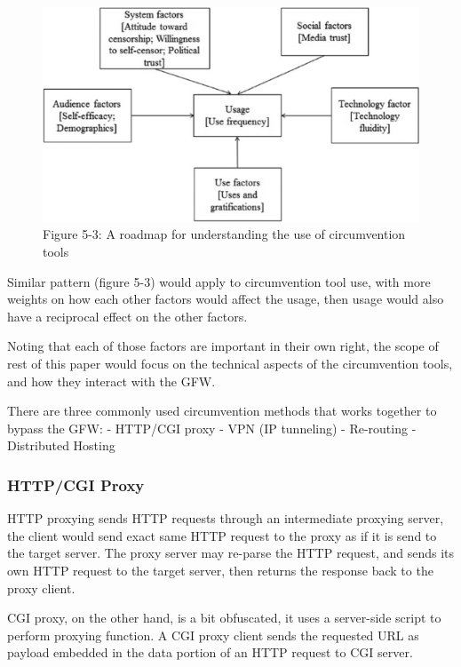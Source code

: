 \begin{figure}
\centering
\includegraphics{./res/5.3-circumventAdopt.png}
\caption{Figure 5-3: A roadmap for understanding the use of
circumvention tools}
\end{figure}

Similar pattern (figure 5-3) \cite{47_circumvention} would apply to
circumvention tool use, with more weights on how each other factors
would affect the usage, then usage would also have a reciprocal effect
on the other factors.

Noting that each of those factors are important in their own right, the
scope of rest of this paper would focus on the technical aspects of the
circumvention tools, and how they interact with the GFW.

There are three commonly used circumvention methods that works together
to bypass the GFW: \cite{07_taxonomy} - HTTP/CGI proxy - VPN (IP
tunneling) - Re-routing - Distributed Hosting

\hypertarget{httpcgi-proxy}{%
\subsubsection{HTTP/CGI Proxy}\label{httpcgi-proxy}}

HTTP proxying sends HTTP requests through an intermediate proxying
server, the client would send exact same HTTP request to the proxy as if
it is send to the target server. The proxy server may re-parse the HTTP
request, and sends its own HTTP request to the target server, then
returns the response back to the proxy client.

CGI proxy, on the other hand, is a bit obfuscated, it uses a server-side
script to perform proxying function. A CGI proxy client sends the
requested URL as payload embedded in the data portion of an HTTP request
to CGI server.

